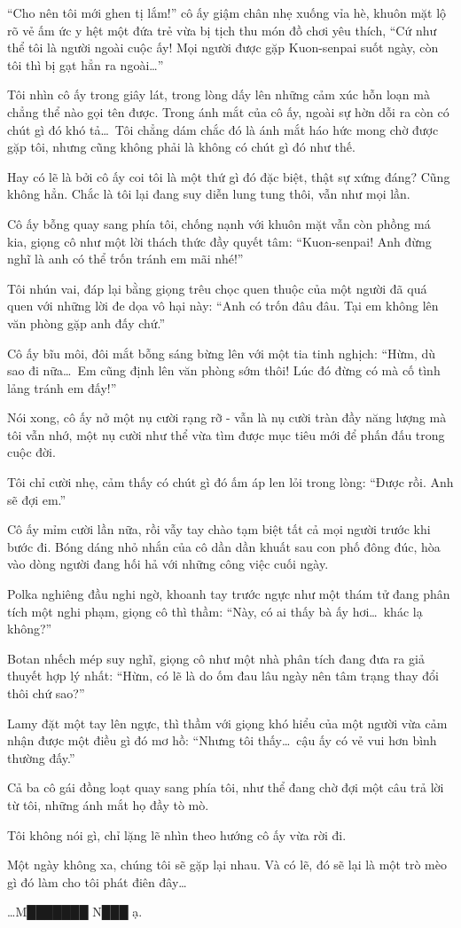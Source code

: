 \documentclass[../main.tex]{subfiles}
\begin{document}
``Cho nên tôi mới ghen tị lắm!'' cô ấy giậm chân nhẹ xuống vỉa hè, khuôn mặt lộ rõ vẻ ấm ức y hệt một đứa trẻ vừa bị tịch thu món đồ chơi yêu thích, ``Cứ như thể tôi là người ngoài cuộc ấy! Mọi người được gặp Kuon-senpai suốt ngày, còn tôi thì bị gạt hẳn ra ngoài\dots''

Tôi nhìn cô ấy trong giây lát, trong lòng dấy lên những cảm xúc hỗn loạn mà chẳng thể nào gọi tên được. Trong ánh mắt của cô ấy, ngoài sự hờn dỗi ra còn có chút gì đó khó tả\dots\ Tôi chẳng dám chắc đó là ánh mắt háo hức mong chờ được gặp tôi, nhưng cũng không phải là không có chút gì đó như thế.

Hay có lẽ là bởi cô ấy coi tôi là một thứ gì đó đặc biệt, thật sự xứng đáng? Cũng không hẳn. Chắc là tôi lại đang suy diễn lung tung thôi, vẫn như mọi lần.

Cô ấy bỗng quay sang phía tôi, chống nạnh với khuôn mặt vẫn còn phồng má kia, giọng cô như một lời thách thức đầy quyết tâm: ``Kuon-senpai! Anh đừng nghĩ là anh có thể trốn tránh em mãi nhé!''

Tôi nhún vai, đáp lại bằng giọng trêu chọc quen thuộc của một người đã quá quen với những lời đe dọa vô hại này: ``Anh có trốn đâu đâu. Tại em không lên văn phòng gặp anh đấy chứ.''

Cô ấy bĩu môi, đôi mắt bỗng sáng bừng lên với một tia tinh nghịch: ``Hừm, dù sao đi nữa\dots\ Em cũng định lên văn phòng sớm thôi! Lúc đó đừng có mà cố tình lảng tránh em đấy!''

Nói xong, cô ấy nở một nụ cười rạng rỡ - vẫn là nụ cười tràn đầy năng lượng mà tôi vẫn nhớ, một nụ cười như thể vừa tìm được mục tiêu mới để phấn đấu trong cuộc đời.

Tôi chỉ cười nhẹ, cảm thấy có chút gì đó ấm áp len lỏi trong lòng: ``Được rồi. Anh sẽ đợi em.''

Cô ấy mỉm cười lần nữa, rồi vẫy tay chào tạm biệt tất cả mọi người trước khi bước đi. Bóng dáng nhỏ nhắn của cô dần dần khuất sau con phố đông đúc, hòa vào dòng người đang hối hả với những công việc cuối ngày.

Polka nghiêng đầu nghi ngờ, khoanh tay trước ngực như một thám tử đang phân tích một nghi phạm, giọng cô thì thầm: ``Này, có ai thấy bà ấy hơi\dots\ khác lạ không?''

Botan  nhếch mép suy nghĩ, giọng cô như một nhà phân tích đang đưa ra giả thuyết hợp lý nhất: ``Hừm, có lẽ là do ốm đau lâu ngày nên tâm trạng thay đổi thôi chứ sao?''

Lamy đặt một tay lên ngực, thì thầm với giọng khó hiểu của một người vừa cảm nhận được một điều gì đó mơ hồ: ``Nhưng tôi thấy\dots\ cậu ấy có vẻ vui hơn bình thường đấy.''

Cả ba cô gái đồng loạt quay sang phía tôi, như thể đang chờ đợi một câu trả lời từ tôi, những ánh mắt họ đầy tò mò.

Tôi không nói gì, chỉ lặng lẽ nhìn theo hướng cô ấy vừa rời đi.

Một ngày không xa, chúng tôi sẽ gặp lại nhau. Và có lẽ, đó sẽ lại là một trò mèo gì đó làm cho tôi phát điên đây\dots

\dots M███████ N███ ạ.
\end{document}
